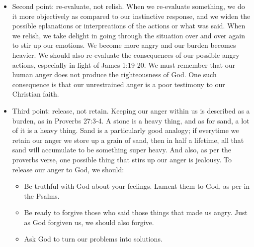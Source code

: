 \begin{itemize}
{\begin{itemize}
{    exist doesn't mean we have to be triggered.  Self-control is a Christian
    virtue, a fruit of the Spirit (Galatians 5:22-23).  Practically, we can
    restrain when we deliberately interrupt our `reactive' response, by
    walking away, slowly counting to 5, taking a break from the situation,
    etc.  If we must respond, we are to give a `soft answer'.  If we can't
    give a `soft answer', it is better to keep quiet.  If we can't give a
    `soft answer' and shout back because of our anger, then the other person
    will get angry also, and then there'll be a relationship breakdown.  The
    above might seem hard to do, but remember that Jesus faced the biggest
    injustice in the world, yet he was like a lamb led to the slaughter; he
    opened not his mouth.}
    \item{Second point: re-evaluate, not relish.  When we re-evaluate
    something, we do it more objectively as compared to our instinctive
    response, and we widen the possible eplanations or interpreations of the
    actions or what was said.  When we relish, we take delight in going through
    the situation over and over again to stir up our emotions.  We become more
    angry and our burden becomes heavier.  We should also re-evaluate the
    consequences of our possible angry actions, especially in light of James
    1:19-20.  We must remember that our human anger does not produce the
    righteousness of God. One such consequence is that our unrestrained anger is a poor testimony to our Christian faith.}
    \item{Third point: release, not retain.  Keeping our anger within us is
    described as a burden, as in Proverbs 27:3-4.  A stone is a heavy thing,
    and as for sand, a lot of it is a heavy thing.  Sand is a particularly
    good analogy; if everytime we retain our anger we store up a grain of
    sand, then in half a lifetime, all that sand will accumulate to be
    something super heavy.  And also, as per the proverbs verse, one possible
    thing that stirs up our anger is jealousy.  To release our anger to God,
    we should:
    \begin{itemize}
      \item{Be truthful with God about your feelings.  Lament them to God, as
        per in the Psalms.}
      \item{Be ready to forgive those who said those things that made us
        angry.  Just as God forgiven us, we should also forgive.}
      \item{Ask God to turn our problems into solutions.}

\end{itemize}}
\end{itemize}}
\end{itemize}
